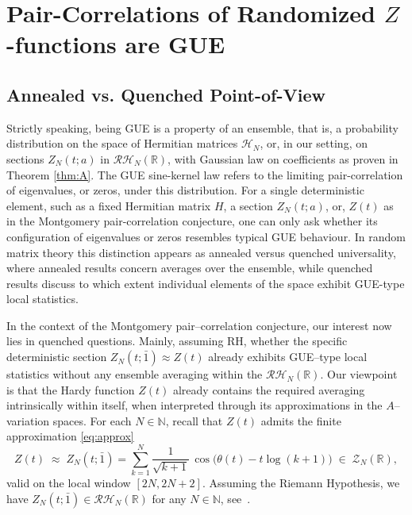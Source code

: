 \documentclass[12pt,reqno]{amsart}
\theoremstyle{plain}
\theoremstyle{definition}
\theoremstyle{remark}
\begin{document}
\section{Pair-Correlations of Randomized $Z$-functions are GUE}
\label{s:9.1}

\subsection{Annealed vs. Quenched Point-of-View} Strictly speaking, being GUE is a property of an ensemble, that is, a probability 
distribution on the space of Hermitian matrices $\mathcal{H}_N$, or, in our setting, on sections $Z_N(t;a)$ in $\mathcal{RH}_N(\mathbb{R})$, 
with Gaussian law on coefficients as proven in Theorem \ref{thm:A}. The GUE sine-kernel law refers to the limiting 
pair-correlation of eigenvalues, or zeros, under this distribution. For a single 
deterministic element, such as a fixed Hermitian matrix $H$, a section $Z_N(t;a)$, or, $Z(t)$ as in the Montgomery pair-correlation conjecture, one can only ask whether its configuration of eigenvalues or zeros resembles typical GUE behaviour. In random matrix theory 
this distinction appears as annealed versus quenched universality, where
annealed results concern averages over the ensemble, while quenched results discuss to which extent 
individual elements of the space exhibit GUE-type local statistics.

In the context of the Montgomery pair–correlation conjecture, our interest now lies in
quenched questions. Mainly, assuming RH, whether the specific deterministic section
\(Z_N(t;\bar 1)\approx Z(t)\) already exhibits GUE–type local statistics without any
ensemble averaging within the
\(\mathcal{RH}_N(\mathbb R)\). Our viewpoint is that the Hardy function \(Z(t)\) 
already contains the required averaging intrinsically within itself, 
when interpreted through its approximations in the $A$--variation spaces.  
For each \(N \in \mathbb{N} \), recall that \(Z(t)\) admits the finite approximation \eqref{eq:approx}
\begin{equation}
Z(t)\;\approx\; Z_N(t;\bar 1)
=\sum_{k=1}^N \frac{1}{\sqrt{k+1}}\,
\cos\!\bigl(\theta(t)-t\log(k+1)\bigr)
\;\in\; \mathcal{Z}_N(\mathbb{R}),
\end{equation}
valid on the local window \([2N,2N+2]\).  
Assuming the Riemann Hypothesis, we have \(Z_N(t;\bar 1)\in\mathcal{RH}_N(\mathbb{R})\) for any $N \in \mathbb{N}$, 
see~\cite{J4}.  
\end{document}
